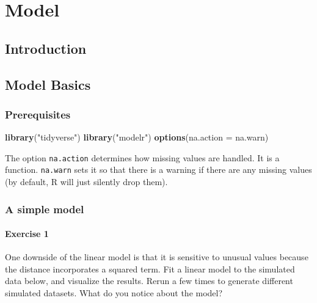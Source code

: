 \documentclass[]{book}
\newenvironment{Shaded}{\begin{snugshade}}{\end{snugshade}}
\newcommand{\DataTypeTok}[1]{\textcolor[rgb]{0.13,0.29,0.53}{#1}}
\newcommand{\KeywordTok}[1]{\textcolor[rgb]{0.13,0.29,0.53}{\textbf{#1}}}
\newcommand{\NormalTok}[1]{#1}
\newcommand{\StringTok}[1]{\textcolor[rgb]{0.31,0.60,0.02}{#1}}
\theoremstyle{definition}
\theoremstyle{definition}
\theoremstyle{definition}
\theoremstyle{remark}
\begin{document}
\hypertarget{part-model}{%
\part{Model}\label{part-model}}

\hypertarget{model-intro}{%
\chapter{Introduction}\label{model-intro}}

\hypertarget{model-basics}{%
\chapter{Model Basics}\label{model-basics}}

\hypertarget{prerequisites}{%
\section{Prerequisites}\label{prerequisites}}

\begin{Shaded}
\begin{Highlighting}[]
\KeywordTok{library}\NormalTok{(}\StringTok{"tidyverse"}\NormalTok{)}
\KeywordTok{library}\NormalTok{(}\StringTok{"modelr"}\NormalTok{)}
\KeywordTok{options}\NormalTok{(}\DataTypeTok{na.action =}\NormalTok{ na.warn)}
\end{Highlighting}
\end{Shaded}

The option \texttt{na.action} determines how missing values are handled.
It is a function. \texttt{na.warn} sets it so that there is a warning if
there are any missing values (by default, R will just silently drop
them).

\hypertarget{a-simple-model}{%
\section{A simple model}\label{a-simple-model}}

\hypertarget{exercise-1-57}{%
\subsection{Exercise 1}\label{exercise-1-57}}

One downside of the linear model is that it is sensitive to unusual
values because the distance incorporates a squared term. Fit a linear
model to the simulated data below, and visualize the results. Rerun a
few times to generate different simulated datasets. What do you notice
about the model?
\end{document}
